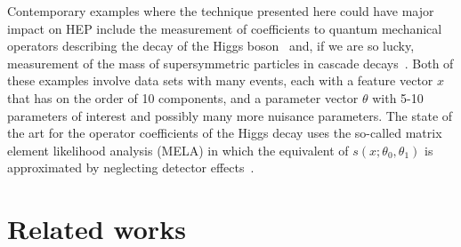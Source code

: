 \documentclass[12pt]{article}
\numberwithin{equation}{section}
\theoremstyle{plain}
\begin{document}
Contemporary examples where the technique presented here could have major impact
on HEP include the measurement of coefficients to quantum mechanical operators
describing the decay of the Higgs boson~\citep{Chen:2014pia} and, if we are so
lucky, measurement of the mass of supersymmetric particles in cascade
decays~\citep{Allanach:2000kt}.  Both of these examples involve data sets with
many events, each with a feature vector $x$ that has on the order of 10
components, and a parameter vector $\theta$ with 5-10 parameters of interest and
possibly many more nuisance parameters. The state of the art for the operator
coefficients of the Higgs decay uses the so-called matrix element likelihood
analysis (MELA) in which the equivalent of $s(x; \theta_0, \theta_1)$ is
approximated by neglecting detector effects~\citep{Gao:2010qx,Bolognesi:2012mm}.



\section{Related works}\label{S:Related}
\end{document}
